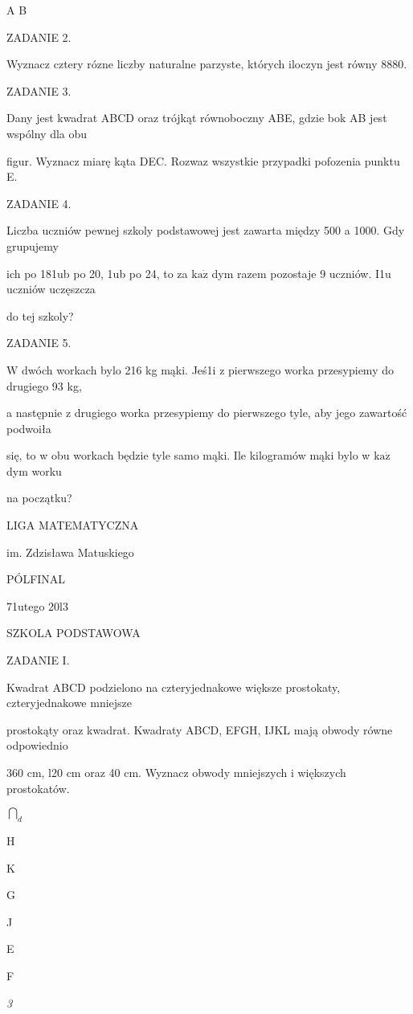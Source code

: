 \documentclass[a4paper,12pt]{article}
\begin{document}
A  B

ZADANIE 2.

Wyznacz cztery rózne liczby naturalne parzyste, których iloczyn jest równy 8880.

ZADANIE 3.

Dany jest kwadrat ABCD oraz trójkąt równoboczny ABE, gdzie bok AB jest wspólny dla obu

figur. Wyznacz miarę kąta DEC. Rozwaz wszystkie przypadki pofozenia punktu E.

ZADANIE 4.

Liczba uczniów pewnej szkoly podstawowej jest zawarta między 500 a 1000. Gdy grupujemy

ich po 181ub po 20, 1ub po 24, to za $\mathrm{k}\mathrm{a}\dot{\mathrm{z}}$ dym razem pozostaje 9 uczniów. I1u uczniów uczęszcza

do tej szkoly?

ZADANIE 5.

$\mathrm{W}$ dwóch workach bylo 216 kg mąki. Jeś1i z pierwszego worka przesypiemy do drugiego 93 kg,

a następnie z drugiego worka przesypiemy do pierwszego tyle, aby jego zawartość podwoiła

się, to w obu workach będzie tyle samo mąki. Ile kilogramów mąki bylo w $\mathrm{k}\mathrm{a}\dot{\mathrm{z}}$ dym worku

na początku?






LIGA MATEMATYCZNA

im. Zdzisława Matuskiego

PÓLFINAL

71utego 20l3

SZKOLA PODSTAWOWA

ZADANIE I.

Kwadrat ABCD podzielono na czteryjednakowe większe prostokaty, czteryjednakowe mniejsze

prostokąty oraz kwadrat. Kwadraty ABCD, EFGH, IJKL mają obwody równe odpowiednio

360 cm, l20 cm oraz 40 cm. Wyznacz obwody mniejszych i większych prostokatów.

$\displaystyle \bigcap_{d}$

H

K

G

J

E

F

{\it 3}
\end{document}
